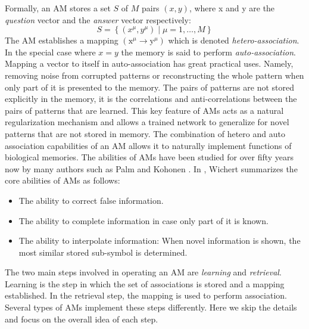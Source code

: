 \documentclass[runningheads]{llncs}
\begin{document}
Formally, an AM stores a set $S$ of $M$ pairs $(x,y)$, where x and y are the \textit{question} vector and the \textit{answer} vector respectively:
\begin{equation}
\label{eqn:S}
S=\left\{\left(x^{\mu}, y^{\mu}\right) \mid \mu=1, \ldots, M\right\}
\end{equation}
The AM establishes a mapping $\left(\mathrm{x}^{\mu} \rightarrow \mathrm{y}^{\mu}\right)$ which is denoted\textit{ hetero-association}.
In the special case where $x=y$ the memory is said to perform \textit{auto-association}. Mapping a vector to itself in auto-association has great practical uses. Namely, removing noise from corrupted patterns or reconstructing the whole pattern when only part of it is presented to the memory. The pairs of patterns are not stored explicitly in the memory, it is the correlations and anti-correlations between the pairs of patterns that are learned. This key feature of AMs acts as a natural regularization mechanism and allows a trained network to generalize for novel patterns that are not stored in memory.
The combination of hetero and auto association capabilities of an AM allows it to naturally implement functions of biological memories. The abilities of AMs have been studied for over fifty years now by many authors such as Palm \cite{palm1980associative} and Kohonen \cite{kohonen2012self}. In \cite{wichert2020principles}, Wichert summarizes the core abilities of AMs as follows:
\begin{itemize}
    \item The ability to correct false information.
    \item The ability to complete information in case only part of it is known.
    \item The ability to interpolate information: When novel information is shown, the most similar stored sub-symbol is determined.
\end{itemize}

The two main steps involved in operating an AM are \textit{learning} and \textit{retrieval}. Learning is the step in which the set of associations is stored and a mapping established. In the retrieval step, the mapping is used to perform association. Several types of AMs implement these steps differently. Here we skip the details and focus on the overall idea of each step.
\end{document}
